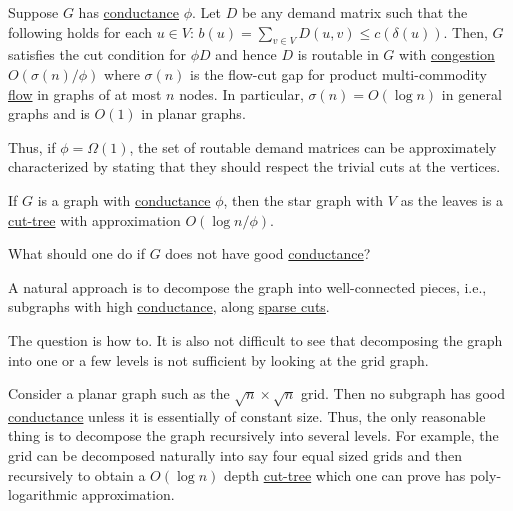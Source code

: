 \begin{claim}
	Suppose \(G\) has \hyperref[def:conductance]{conductance} \(\phi \). Let \(D\) be any demand matrix such that the following holds for each \(u \in V\): \(b(u) = \sum_{v \in V} D(u, v) \leq c(\delta (u))\). Then, \(G\) satisfies the cut condition for \(\phi D\) and hence \(D\) is routable in \(G\) with \hyperref[def:congestion]{congestion} \(O(\sigma (n) / \phi )\) where \(\sigma (n)\) is the flow-cut gap for product multi-commodity \hyperref[def:flow]{flow} in graphs of at most \(n\) nodes. In particular, \(\sigma (n) = O(\log n)\) in general graphs and is \(O(1)\) in planar graphs.
\end{claim}

Thus, if \(\phi = \Omega (1)\), the set of routable demand matrices can be approximately characterized by stating that they should respect the trivial cuts at the vertices.

\begin{eg}[Expander]
	If \(G\) is a graph with \hyperref[def:conductance]{conductance} \(\phi \), then the star graph with \(V\) as the leaves is a \hyperref[def:cut-tree]{cut-tree} with approximation \(O(\log n / \phi )\).
	\begin{center}
	\end{center}
\end{eg}

What should one do if \(G\) does not have good \hyperref[def:conductance]{conductance}?

\begin{intuition}
	A natural approach is to decompose the graph into well-connected pieces, i.e., subgraphs with high \hyperref[def:conductance]{conductance}, along \hyperref[prb:non-uniform-sparsest-cut]{sparse cuts}.
\end{intuition}

The question is how to. It is also not difficult to see that decomposing the graph into one or a few levels is not sufficient by looking at the grid graph.

\begin{eg}[Grid]
	Consider a planar graph such as the \(\sqrt{n} \times \sqrt{n} \) grid. Then no subgraph has good \hyperref[def:conductance]{conductance} unless it is essentially of constant size. Thus, the only reasonable thing is to decompose the graph recursively into several levels. For example, the grid can be decomposed naturally into say four equal sized grids and then recursively to obtain a \(O(\log n)\) depth \hyperref[def:cut-tree]{cut-tree} which one can prove has poly-logarithmic approximation.
	\begin{center}
	\end{center}
\end{eg}

